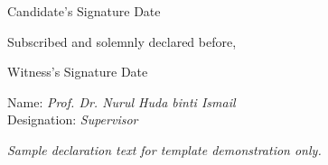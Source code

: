 \vspace{1.4cm}
\noindent Candidate's Signature \hfill Date

\vspace{1.0cm}
\noindent Subscribed and solemnly declared before,

\vspace{1.4cm}
\noindent Witness's Signature \hfill Date

\medskip
\noindent Name: \textit{Prof. Dr. Nurul Huda binti Ismail}\\
Designation: \textit{Supervisor}

\bigskip
\begin{center}
\footnotesize\color{umslate!70}\textit{Sample declaration text for template demonstration only.}
\end{center}

